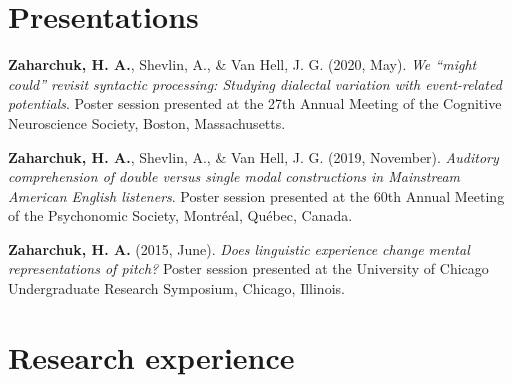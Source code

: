 \documentclass[11pt, a4paper]{awesome-cv}
\begin{document}
\hypertarget{presentations}{%
\section{Presentations}\label{presentations}}

\setlength{\parindent}{-0.2in}
\setlength{\leftskip}{0.2in}

\noindent

\hypertarget{refs_present}{}
\leavevmode\hypertarget{ref-3}{}%
\textbf{\textbf{Zaharchuk, H.} A.}, Shevlin, A., \& Van Hell, J. G. (2020, May). \emph{We
{``might could''} revisit syntactic processing: Studying dialectal
variation with event-related potentials}. Poster session presented at
the {27th Annual Meeting of the Cognitive Neuroscience Society, Boston,
Massachusetts}.

\leavevmode\hypertarget{ref-2}{}%
\textbf{\textbf{Zaharchuk, H.} A.}, Shevlin, A., \& Van Hell, J. G. (2019, November).
\emph{Auditory comprehension of double versus single modal constructions
in {M}ainstream {A}merican {E}nglish listeners}. Poster session
presented at the {60th Annual Meeting of the Psychonomic Society,
Montr{é}al, Qu{é}bec, Canada}.

\leavevmode\hypertarget{ref-1}{}%
\textbf{\textbf{Zaharchuk, H.} A.} (2015, June). \emph{Does linguistic experience change
mental representations of pitch?} Poster session presented at the
{University of Chicago Undergraduate Research Symposium, Chicago,
Illinois}.

\hypertarget{research-experience}{%
\section{Research experience}\label{research-experience}}

\begin{cventries}
\end{cventries}
\end{document}
